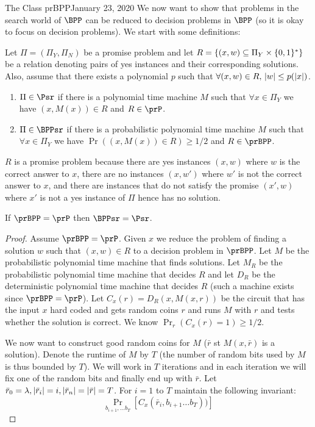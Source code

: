 \begin{lecture}{1}{The Class prBPP}{January 23, 2020}
We now want to show that problems in the search world of $\BPP$ can be reduced to decision problems in $\BPP$ (so it is okay to focus on decision problems). We start with some definitions:

\begin{definition}
	Let $\Pi = (\Pi_Y,\Pi_N)$ be a promise problem and let $R=\{ (x,w) \subseteq \Pi_Y \times \{0,1\}^* \}$ be a relation denoting pairs of yes instances and their corresponding solutions. Also, assume that there exists a polynomial $p$ such that $\forall (x,w) \in R, \, \lvert w\rvert \leq p(\lvert x\rvert)$.
	
	\begin{enumerate}
		\item $\Pi \in \Psr$ if there is a polynomial time machine $M$ such that $\forall x \in \Pi_Y$ we have $(x, M(x)) \in R$ and $R \in \prP$.
		\item $\Pi \in \BPPsr$ if there is a probabilistic polynomial time machine $M$ such that $\forall x \in \Pi_Y$ we have $\Pr( (x, M(x)) \in R) \geq 1/2$ and $R \in \prBPP$.		
	\end{enumerate}
\end{definition}

$R$ is a promise problem because there are yes instances $(x,w)$ where $w$ is the correct answer to $x$, there are no instances $(x,w')$ where $w'$ is not the correct answer to $x$, and there are instances that do not satisfy the promise $(x',w)$ where $x'$ is not a yes instance of $\Pi$ hence has no solution.

\begin{theorem}
	If $\prBPP = \prP$ then $\BPPsr = \Psr$.
\end{theorem}
\begin{proof}
	Assume $\prBPP=\prP$. Given $x$ we reduce the problem of finding a solution $w$ such that $(x,w) \in R$ to a decision problem in $\prBPP$. Let $M$ be the probabilistic polynomial time machine that finds solutions. Let $M_R$ be the probabilistic polynomial time machine that decides $R$ and let $D_R$ be the deterministic polynomial time machine that decides $R$ (such a machine exists since $\prBPP=\prP$). 
	Let $C_x(r)= D_R(x, M(x,r))$ be the circuit that has the input $x$ hard coded and gets random coins $r$ and runs $M$ with $r$ and tests whether the solution is correct. We know $\Pr_r(C_x(r)=1) \geq 1/2$.
	
	We now want to construct good random coins for $M$ ($\bar{r}$ st $M(x,\bar{r})$ is a solution). Denote the runtime of $M$ by $T$ (the number of random bits used by $M$ is thus bounded by $T$). We will work in $T$ iterations and in each iteration we will fix one of the random bits and finally end up with $\bar{r}$. Let $\bar{r}_0 = \lambda, \lvert\bar{r}_i\rvert=i, \lvert\bar{r}_n\rvert = \lvert\bar{r}\rvert = T$.
	For $i=1$ to $T$ maintain the following invariant:
	\[
		\Pr_{b_{i+1},\ldots b_T}[C_x(\bar{r}_i, b_{i+1} \ldots b_T))]
	\]
	

\end{proof}
\end{lecture}
